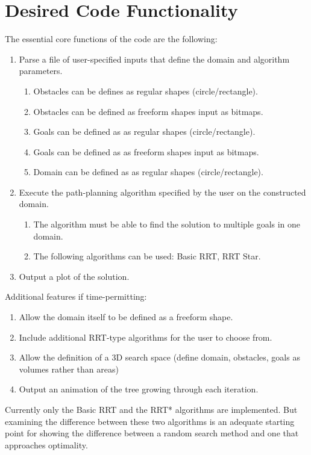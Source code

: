 \documentclass[10pt]{article}
\begin{document}
\newpage
\section{Desired Code Functionality}

	The essential core functions of the code are the following:
	
	\begin{enumerate}
		\item Parse a file of user-specified inputs that define the domain and algorithm parameters.
		\begin{enumerate}
			\item Obstacles can be defines as regular shapes (circle/rectangle).
			\item Obstacles can be defined as freeform shapes input as bitmaps.
			\item Goals can be defined as as regular shapes (circle/rectangle).
			\item Goals can be defined as as freeform shapes input as bitmaps.
			\item Domain can be defined as as regular shapes (circle/rectangle).
		\end{enumerate}	
		\item Execute the path-planning algorithm specified by the user on the constructed domain.
		\begin{enumerate}
				\item The algorithm must be able to find the solution to multiple goals in one domain.
				\item The following algorithms can be used: Basic RRT, RRT Star.
		\end{enumerate}		
		\item Output a plot of the solution.
	\end{enumerate}

	Additional features if time-permitting:
	\begin{enumerate}
		\item Allow the domain itself to be defined as a freeform shape.
		\item Include additional RRT-type algorithms for the user to choose from.
		\item Allow the definition of a 3D search space (define domain, obstacles, goals as volumes rather than areas)
		\item Output an animation of the tree growing through each iteration.
	\end{enumerate}

	Currently only the Basic RRT and the RRT* algorithms are implemented. But examining the difference between these two algorithms is an adequate starting point for showing the difference between a random search method and one that approaches optimality.
\end{document}
